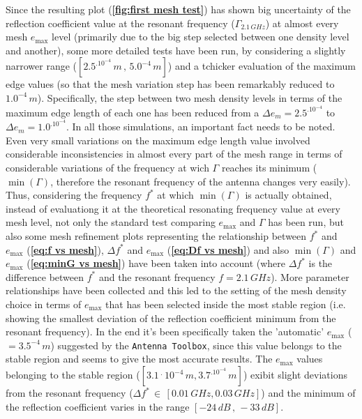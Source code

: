 \documentclass[12pt,a4paper]{article}
\begin{document}
{\begin{multicols}{2}
Since the resulting plot  (\textbf{\cref{fig:first mesh test}}) has shown big uncertainty of the reflection coefficient value at the resonant frequency ($\Gamma_{2.1\,GHz}$) at almost every mesh $e_{\max}$ level (primarily due to the big step selected between one density level and another), some more detailed tests have been run, by considering a slightly narrower range ($[2.5^.10^{-4}\,m\,,\,5.0^{-4}\,m]$) and a tchicker evaluation of the maximum edge values (so that the mesh variation step has been remarkably reduced to $1.0^{-4}\,m$). Specifically, the step between two mesh density levels in terms of the maximum edge length of each one has been reduced from a $\Delta e_m=2.5^.10^{-4}$ to $\Delta e_m=1.0^.10^{-4}$. In all those simulations, an important fact needs to be noted. Even very small variations on the maximum edge length value involved considerable inconsistencies in almost every part of the mesh range in terms of considerable variations of the frequency at wich $\Gamma$ reaches its minimum ($\min(\Gamma)$, therefore the resonant frequency of the antenna changes very easily).  
Thus, considering the frequency $f^*$ at which $\min(\Gamma)$ is actually obtained, instead of evaluationg it at the theoretical resonating frequency value at every mesh level, not only the standard test comparing $e_{\max}$ and $\Gamma$ has been run, but also some mesh refinement plots representing the relationship between $f^*$ and $e_{\max}$ (\textbf{\cref{eq:f vs mesh}}), $\Delta f^*$ and $e_{\max}$ (\textbf{\cref{eq:Df vs mesh}}) and also $\min(\Gamma)$ and $e_{\max}$ (\textbf{\cref{eq:minG vs mesh}}) have been taken into account (where $\Delta f^*$ is the difference between $f^*$ and the resonant frequency $f=2.1\,GHz$). More parameter relationships have been collected and this led to the setting of the mesh density choice in terms of $e_{\max}$ that has been selected inside the most stable region (i.e. showing the smallest deviation of the reflection coefficient minimum from the resonant frequency). In the end it's been specifically taken the 'automatic' $e_{\max}$ ($=3.5^{-4}\,m$) suggested by the \texttt{\color{Mahogany}Antenna Toolbox}, since this value  belongs to the stable region and seems to give the most accurate results. The $e_{\max}$ values belonging to the stable region ($[3.1\,^.\,10^{-4}\,m,3.7^.10^{-4}\,m]$) exibit slight deviations from the resonant frequency ($\Delta f^*\,\in\,[0.01\,GHz,0.03\,GHz]$) and the minimum of the reflection coefficient varies in the range $[-24\,dB\,,\,-33\,dB]$. 

\end{multicols}}
\end{document}
